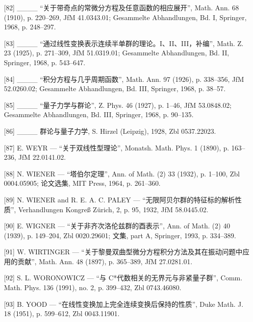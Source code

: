 {[}82{]} \_\_\_\_ “关于带奇点的常微分方程及任意函数的相应展开”, Math. Ann. 68 (1910), p. 220–269, JfM 41.0343.01; Gesammelte Abhandlungen, Bd. I, Springer, 1968, p. 248–297.

{[}83{]} \_\_\_\_ “通过线性变换表示连续半单群的理论。I、II、III，补编”, Math. Z. 23 (1925), p. 271–309, JfM 51.0319.01; Gesammelte Abhandlungen, Bd. II, Springer, 1968, p. 543–647.

{[}84{]} \_\_\_\_ “积分方程与几乎周期函数”, Math. Ann. 97 (1926), p. 338–356, JfM 52.0260.02; Gesammelte Abhandlungen, Bd. III, Springer, 1968, p. 38–57.

{[}85{]} \_\_\_\_ “量子力学与群论”, Z. Phys. 46 (1927), p. 1–46, JfM 53.0848.02; Gesammelte Abhandlungen, Bd. III, Springer, 1968, p. 90–135.

{[}86{]} \_\_\_\_ 群论与量子力学, S. Hirzel (Leipzig), 1928, Zbl 0537.22023.

{[}87{]} E. WEYR — “关于双线性型理论”, Monatsh. Math. Phys. 1 (1890), p. 163–236, JfM 22.0141.02.

{[}88{]} N. WIENER — “塔伯尔定理”, Ann. of Math. (2) 33 (1932), p. 1–100, Zbl 0004.05905; 论文选集, MIT Press, 1964, p. 261–360.

{[}89{]} N. WIENER and R. E. A. C. PALEY — “无限阿贝尔群的特征标的解析性质”, Verhandlungen Kongreß Zürich, 2, p. 95, 1932, JfM 58.0445.02.

{[}90{]} E. WIGNER — “关于非齐次洛伦兹群的酉表示”, Ann. of Math. (2) 40 (1939), p. 149–204, Zbl 0020.29601; 文集, part A, Springer, 1993, p. 334–389.

{[}91{]} W. WIRTINGER — “关于黎曼双曲型微分方程积分方法及其在振动问题中应用的贡献”, Math. Ann. 48 (1897), p. 365–389, JfM 27.0281.01.

{[}92{]} S. L. WORONOWICZ — “与 C*代数相关的无界元与非紧量子群”, Comm. Math. Phys. 136 (1991), no. 2, p. 399–432, Zbl 0743.46080.

{[}93{]} B. YOOD — “在线性变换加上完全连续变换后保持的性质”, Duke Math. J. 18 (1951), p. 599–612, Zbl 0043.11901.


